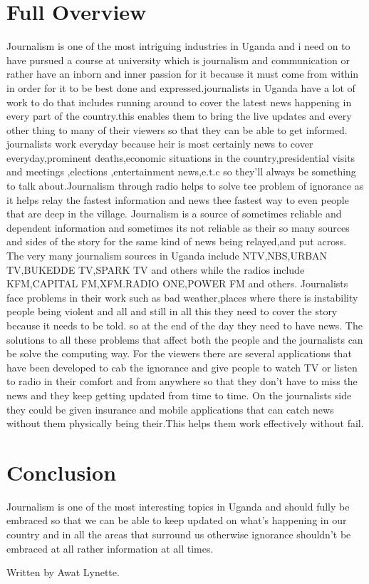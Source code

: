 \documentclass[12pt,]{article}
\begin{document}
\section{Full Overview}
Journalism is one of the most intriguing industries in Uganda and i need on to have pursued a course at university which is journalism and communication or rather have an inborn and inner  passion for it because it must come from within in order for it to be best done and expressed.journalists in Uganda have a lot of work to do that includes running around to cover the latest news happening in every part of the country.this enables them to bring the live updates and every other thing to many of their viewers so that they can be able to get informed.
journalists work everyday because heir is most certainly news to cover everyday,prominent deaths,economic situations in the country,presidential visits and meetings ,elections ,entertainment news,e.t.c so they'll always be something to talk about.Journalism through radio helps to solve tee problem of ignorance as it helps relay the fastest information and news thee fastest way to even people that are deep in the village.
Journalism is a source of sometimes reliable and dependent information and sometimes its not reliable as their so many sources and sides of the story for the same kind of news being relayed,and put across.
  The very many journalism sources in Uganda include NTV,NBS,URBAN TV,BUKEDDE TV,SPARK TV and others while the radios include KFM,CAPITAL FM,XFM.RADIO ONE,POWER FM and others.
 Journalists face problems in their work such as bad weather,places where there is instability people being violent and all and still in all this they need to cover the story because it needs to be told. so at the end of the day they need to have news.
 The  solutions to all these problems that affect both the people and the journalists can be solve the computing way. 
For the viewers there are several applications that have been developed to cab the ignorance and give people to watch TV or listen to radio in their comfort and from anywhere so that they don't have to miss the news and they keep getting updated from time to time.
 On the journalists side they could be given insurance and mobile applications that can catch news without them physically being their.This helps them work effectively without fail.
\section{Conclusion}
Journalism is one of the most interesting topics in Uganda and should fully be embraced so that we can be able to keep updated on what's happening in our country and in all the areas that surround us otherwise ignorance shouldn't be embraced at all rather information at all times.



         Written by Awat Lynette.
\end{document}
